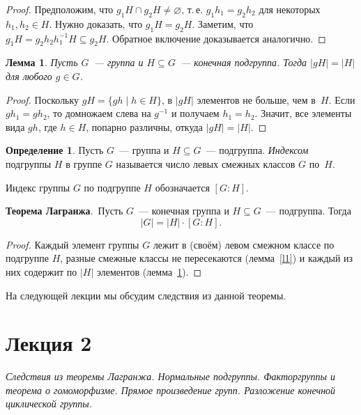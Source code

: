 \documentclass[a4paper,10pt]{amsart}
\newtheorem{lemma}{Лемма}
\theoremstyle{definition}
\newtheorem{definition}{Определение}
\theoremstyle{remark}
\begin{document}
\begin{proof}
Предположим, что $g_1H\cap g_2H\ne\varnothing$, т.\,е.
$g_1h_1=g_2h_2$ для некоторых $h_1,h_2\in H$. Нужно доказать, что
$g_1H=g_2H$. Заметим, что $g_1H=g_2h_2h_1^{-1}H\subseteq g_2H$.
Обратное включение доказывается аналогично.
\end{proof}

\begin{lemma} \label{l2}
Пусть $G$~--- группа и $H\subseteq G$~--- конечная подгруппа. Тогда
$|gH|=|H|$ для любого $g\in G$.
\end{lemma}

\begin{proof}
Поскольку $gH=\{gh \mid h\in H\}$, в $|gH|$ элементов не больше, чем
в~$H$. Если $gh_1=gh_2$, то домножаем слева на $g^{-1}$ и получаем
$h_1=h_2$. Значит, все элементы вида $gh$, где $h\in H$, попарно
различны, откуда $|gH|=|H|$.
\end{proof}

\begin{definition}
Пусть $G$~--- группа и $H\subseteq G$~--- подгруппа. {\it Индексом}
подгруппы $H$ в группе $G$ называется число левых смежных классов
$G$ по~$H$.
\end{definition}

Индекс группы $G$ по подгруппе $H$ обозначается $[G:H]$.

\smallskip

{\bf Теорема Лагранжа}.\ Пусть $G$~--- конечная группа и $H\subseteq
G$~--- подгруппа. Тогда
$$
|G| = |H| \cdot [G:H].
$$

\begin{proof}
Каждый элемент группы $G$ лежит в (своём) левом смежном классе по
подгруппе $H$, разные смежные классы не пересекаются
(лемма~\ref{l1}) и каждый из них содержит по $|H|$ элементов
(лемма~\ref{l2}).
\end{proof}

На следующей лекции мы обсудим следствия из данной теоремы.


\newpage

\section*{Лекция 2}

\medskip

{\it Следствия из теоремы Лагранжа. Нормальные подгруппы. Факторгруппы и теорема о гомоморфизме. Прямое произведение групп. Разложение конечной циклической группы.}
\end{document}
